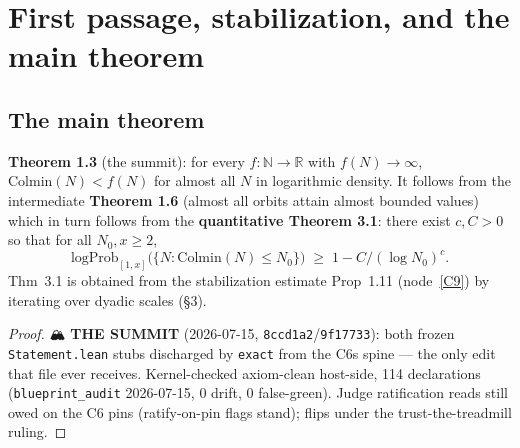 \chapter{First passage, stabilization, and the main theorem}\label{chp:mainthm}

\section{The main theorem}

\begin{theorem}\label{C6}
  \leanok
\textbf{Theorem 1.3} (the summit): for every \(f:\mathbb{N}\to\mathbb{R}\) with
\(f(N)\to\infty\), \(\mathrm{Colmin}(N)<f(N)\) for almost all \(N\) in logarithmic density.
It follows from the intermediate \textbf{Theorem 1.6} (almost all orbits attain almost bounded
values) which in turn follows from the \textbf{quantitative Theorem 3.1}: there exist
\(c,C>0\) so that for all \(N_0,x\ge 2\),
\[
  \mathrm{logProb}_{[1,x]}\bigl(\{N : \mathrm{Colmin}(N)\le N_0\}\bigr)
    \;\ge\; 1 - C/(\log N_0)^{c}.
\]
Thm~3.1 is obtained from the stabilization estimate Prop~1.11 (node~\ref{C9}) by iterating
over dyadic scales (§3).
\end{theorem}
\begin{proof}
  \leanok
  🏔️ \textbf{THE SUMMIT} (2026-07-15, \texttt{8ccd1a2}/\texttt{9f17733}): both frozen
  \texttt{Statement.lean} stubs discharged by \texttt{exact} from the C6s spine — the only
  edit that file ever receives.  Kernel-checked axiom-clean host-side, 114 declarations
  (\texttt{blueprint\_audit} 2026-07-15, 0 drift, 0 false-green).  Judge ratification reads
  still owed on the C6 pins (ratify-on-pin flags stand); flips under the trust-the-treadmill
  ruling.
\end{proof}


